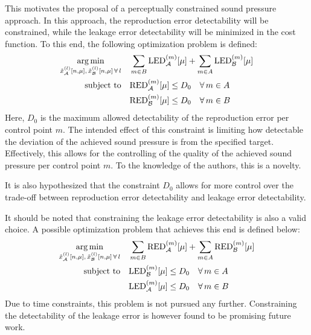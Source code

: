 This motivates the proposal of a perceptually constrained sound pressure approach.
In this approach, the reproduction error detectability will be constrained, while the leakage error detectability will be minimized in the cost function.
To this end, the following optimization problem is defined:
\begin{equation}
    \begin{aligned}
    \operatorname*{arg\,min}_{\tilde{x}_{\mathcal{A}}^{(l)}[n,\mu],\,\tilde{x}_{\mathcal{B}}^{(l)}[n,\mu]\,\forall\,l}\quad 
       & \sum_{m\in B}\text{LED}_{\mathcal{A}}^{(m)}[\mu] + \sum_{m\in A}\text{LED}_{\mathcal{B}}^{(m)}[\mu]\\
        \operatorname*{subject\,\,to}\quad & \text{RED}_{\mathcal{A}}^{(m)}[\mu] \leq D_0 \quad\forall\, m\in A\\
                    & \text{RED}_{\mathcal{B}}^{(m)}[\mu] \leq D_0 \quad\forall\, m\in B
    \end{aligned}
    \label{eq:perceptual_constrained}
\end{equation}
Here, $D_0$ is the maximum allowed detectability of the reproduction error per control point $m$.
The intended effect of this constraint is limiting how detectable the deviation of the achieved sound pressure is from the specified target.
Effectively, this allows for the controlling of the quality of the achieved sound pressure per control point $m$. 
To the knowledge of the authors, this is a novelty.

It is also hypothesized that the constraint $D_0$ allows for more control over the trade-off between reproduction error detectability and 
leakage error detectability.

It should be noted that constraining the leakage error detectability is also a valid choice.
A possible optimization problem that achieves this end is defined below:
\begin{equation}
    \begin{aligned}
    \operatorname*{arg\,min}_{\tilde{x}_{\mathcal{A}}^{(l)}[n,\mu],\,\tilde{x}_{\mathcal{B}}^{(l)}[n,\mu]\,\forall\,l}\quad 
       & \sum_{m\in B}\text{RED}_{\mathcal{A}}^{(m)}[\mu] + \sum_{m\in A}\text{RED}_{\mathcal{B}}^{(m)}[\mu]\\
        \operatorname*{subject\,\,to}\quad & \text{LED}_{\mathcal{B}}^{(m)}[\mu] \leq D_0 \quad\forall\, m\in A\\
                    & \text{LED}_{\mathcal{A}}^{(m)}[\mu] \leq D_0 \quad\forall\, m\in B
    \end{aligned}
\end{equation}
Due to time constraints, this problem is not pursued any further.
Constraining the detectability of the leakage error is however found to be promising future work.
